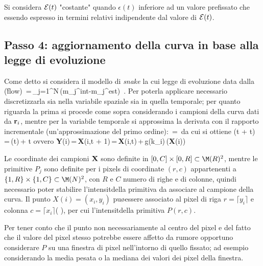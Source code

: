 Si considera ${\cal E}(t)$ "costante" quando $\epsilon(t)$ \e inferiore ad un valore
prefissato che essendo espresso in termini relativi \e indipendente dal valore di
${\cal E}(t)$.

\subsection{Passo 4: aggiornamento della curva in base alla legge di evoluzione}

Come detto si considera il modello di {\it snake} la cui legge di evoluzione \e data dalla (\r{flow})
\be
{}\,=\,\sum_{j=1}^{N}\,(m_j^{int}-m_j^{est})\,
              .
\ee
Per poterla applicare \e necessario discretizzarla sia nella variabile spaziale sia in 
quella temporale; per quanto riguarda la prima si procede come sopra considerando i campioni
della curva dati da ${\bf r}_i$, mentre per la variabile temporale si approssima la
derivata con il rapporto incrementale (un'approssimazione del primo ordine):
\be
{}\,=\,
\ee
da cui si ottiene 
\be
\Gamma (t + \Delta t)\,=\,\Gamma (t)\,+\,\,\Delta t
\ee
ovvero
\be
{\bf Y}(i)\,=\,{\bf X}(i,t + 1)\,=\,{\bf X}(i,t)\,+\,g(k_i)\,({\bf X}(i))
\ee

\boss
Le coordinate dei campioni ${\bf X}$ sono definite in $[0,C]\times[0,R]\subset\M(R)^2$, mentre
le primitive $P_j$ sono definite per i pixels di coordinate $(r,c)$ appartenenti a
$\{1,R\}\times\{1,C\}\subset\M(N)^2$, con $R$ e $C$ numero di righe e di colonne, quindi \e
necessario poter stabilire l'intensit\a della primitiva da associare al campione della
curva.
Il punto $X(i)=(x_i,y_i)$ pu\o essere associato al pixel di riga $r=\lceil y_i \rceil$
e colonna $c=\lceil x_i \rceil$( \footnotemark ), per cui l'intensit\a della primitiva \e
$P(r,c)$.

Per tener conto che il punto non \e necessariamente al centro del pixel e del fatto che il
valore del pixel stesso potrebbe essere affetto da rumore \e opportuno considerare $P$ su una
finestra di pixel nell'intorno di quello fissato; ad esempio considerando la media pesata
o la mediana dei valori dei pixel della finestra.
\eoss

